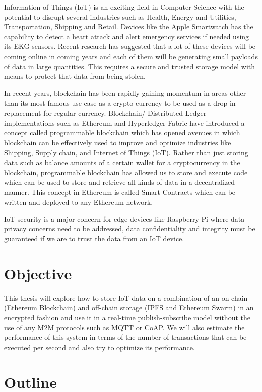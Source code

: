 \documentclass[11pt,openright]{report}
\begin{document}
Information of Things (IoT) is an exciting field in Computer Science with the potential to disrupt several industries such as Health, Energy and Utilities, Transportation, Shipping and Retail. Devices like the Apple Smartwatch has the capability to detect a heart attack and alert emergency services if needed using its EKG sensors. Recent research has suggested that a lot of these devices will be coming online in coming years and each of them will be generating small payloads of data in large quantities. This requires a secure and trusted storage model with means to protect that data from being stolen. 

In recent years, blockchain has been rapidly gaining momentum in areas other than its most famous use-case as a crypto-currency to be used as a drop-in replacement for regular currency. Blockchain/ Distributed Ledger implementations such as Ethereum and Hyperledger Fabric have introduced a concept called programmable blockchain which has opened avenues in which blockchain can be effectively used to improve and optimize industries like Shipping, Supply chain, and Internet of Things (IoT). Rather than just storing data such as balance amounts of a certain wallet for a cryptocurrency in the blockchain, programmable blockchain has allowed us to store and execute code which can be used to store and retrieve all kinds of data in a decentralized manner. This concept in Ethereum is called Smart Contracts which can be written and deployed to any Ethereum network.

IoT security is a major concern for edge devices like Raspberry Pi where data privacy concerns need to be addressed, data confidentiality and integrity must be guaranteed if we are to trust the data from an IoT device. 

\section{Objective}\label{section:objective}
This thesis will explore how to store IoT data on a combination of an on-chain (Ethereum Blockchain) and off-chain storage (IPFS and Ethereum Swarm) in an encrypted fashion and use it in a real-time publish-subscribe model without the use of any M2M protocols such as MQTT or CoAP. We will also estimate the performance of this system in terms of the number of transactions that can be executed per second and also try to optimize its performance.

\section{Outline}\label{section:outline}
\end{document}
